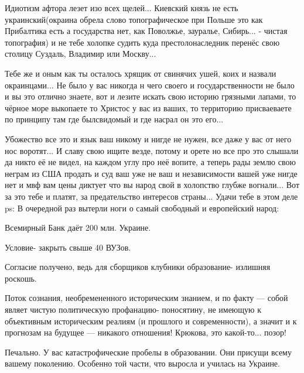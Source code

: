 \begin{itemize}
Идиотизм афтора лезет изо всех щелей... Киевский князь не есть
украинский(окраина обрела слово топографическое при Польше это как Прибалтика
есть а государства нет, как Поволжье, зауралье, Сибирь... - чистая топография)
и не тебе холопке судить куда престолонаследник перенёс свою столицу Суздаль,
Владимир или Москву... 

Тебе же и оным как ты осталось хрящик от свинячих ушей,
коих и назвали окраинцами... Не было у вас никогда н чего своего и
государственности не было и вы это отлично знаете, вот и лезите искать свою
историю грязными лапами, то чёрное море выкопаете то Христос у вас из ваших, то
территорию присваеваете по принципу там где былсвидомый и где насрал он это
его... 

Убожество все это и язык ваш никому и нигде не нужен, все даже у вас от него
нос воротят... И славу свою ищите везде, потому и орете но все про это слышали
да никто её не видел, на каждом углу про неё вопите, а теперь рады землю свою
неграм из США продать и суд ваш уже не ваш и независимости вашей уже нигде нет
и мвф вам цены диктует что вы народ свой в холопство глубже вогнали... Вот за
это тебе и платят, за предательство интересов страны... Удачи тебе в этом деле
ps: В очередной раз вытерли ноги о самый свободный и европейский народ:

Всемирный Банк даёт 200 млн. Украине.

Условие- закрыть свыше 40 ВУЗов.

Согласие получено, ведь для сборщиков клубники образование- излишняя роскошь.

 

Поток сознания, необремененного историческим знанием, и по факту — собой являет
чистую политическую профанацию- поносятину, не имеющую к объективным
историческим реалиям (и прошлого и современности), а значит и к прогнозам на
будущее — никакого отношения! Крюкова, это какой-то... позор!


 

Печально. У вас катастрофические пробелы в образовании. Они присущи всему
вашему поколению. Особенно той части, что выросла и училась на Украине.


\end{itemize}
